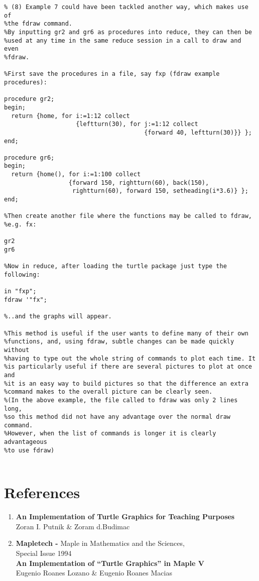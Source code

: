 \begin{verbatim}
% (8) Example 7 could have been tackled another way, which makes use of 
%the fdraw command.
%By inputting gr2 and gr6 as procedures into reduce, they can then be 
%used at any time in the same reduce session in a call to draw and even
%fdraw.

%First save the procedures in a file, say fxp (fdraw example procedures):

procedure gr2;
begin;
  return {home, for i:=1:12 collect
                    {leftturn(30), for j:=1:12 collect
                                       {forward 40, leftturn(30)}} };
end;

procedure gr6;
begin;
  return {home(), for i:=1:100 collect
                  {forward 150, rightturn(60), back(150),
                   rightturn(60), forward 150, setheading(i*3.6)} };
end;

%Then create another file where the functions may be called to fdraw,
%e.g. fx:

gr2
gr6

%Now in reduce, after loading the turtle package just type the following:

in "fxp";
fdraw '"fx";

%..and the graphs will appear.

%This method is useful if the user wants to define many of their own
%functions, and, using fdraw, subtle changes can be made quickly without 
%having to type out the whole string of commands to plot each time. It 
%is particularly useful if there are several pictures to plot at once and 
%it is an easy way to build pictures so that the difference an extra 
%command makes to the overall picture can be clearly seen.
%(In the above example, the file called to fdraw was only 2 lines long,
%so this method did not have any advantage over the normal draw command. 
%However, when the list of commands is longer it is clearly advantageous 
%to use fdraw)


\end{verbatim}


\section{References}

\begin{enumerate}
 \item {\bf An Implementation of Turtle Graphics for Teaching Purposes}\\
         Zoran I. Putnik \& Zoram d.Budimac

 \item {\bf Mapletech -} Maple in Mathematics and the Sciences,\\ 
        Special Issue 1994\\
       {\bf An Implementation of ``Turtle Graphics'' in Maple V}\\
         Eugenio Roanes Lozano \&  Eugenio Roanes Macias

\end{enumerate}




